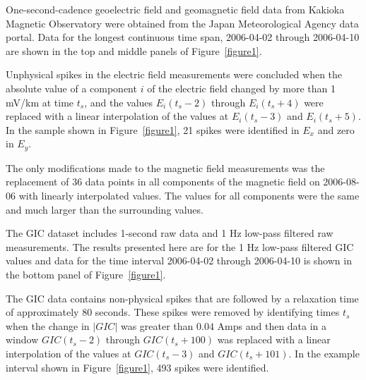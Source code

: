 \documentclass[draft,linenumbers]{agujournal2018}
\begin{document}
One-second-cadence geoelectric field and geomagnetic field data from Kakioka Magnetic Observatory were obtained from the Japan Meteorological Agency data portal. Data for the longest continuous time span, 2006-04-02 through 2006-04-10 are shown in the top and middle panels of Figure~\ref{figure1}.

Unphysical spikes in the electric field measurements were concluded when the absolute value of a component $i$ of the electric field changed by more than 1 mV/km at time $t_s$, and the values $E_i(t_s-2)$ through $E_i(t_s+4)$ were replaced with a linear interpolation of the values at $E_i(t_s-3)$ and $E_i(t_s + 5)$. In the sample shown in Figure~\ref{figure1}, 21 spikes were identified in $E_x$ and zero in $E_y$.

The only modifications made to the magnetic field measurements was the replacement of 36 data points in all components of the magnetic field on 2006-08-06 with linearly interpolated values. The values for all components were the same and much larger than the surrounding values.

The GIC dataset includes 1-second raw data and 1 Hz low-pass filtered raw measurements.  The results presented here are for the 1 Hz low-pass filtered GIC values and data for the time interval 2006-04-02 through 2006-04-10 is shown in the bottom panel of Figure~\ref{figure1}.

The GIC data contains non-physical spikes that are followed by a relaxation time of approximately 80 seconds. These spikes were removed by identifying times $t_s$ when the change in $|GIC|$ was greater than $0.04$ Amps and then data in a window $GIC(t_s-2)$ through $GIC(t_s+100)$ was replaced with a linear interpolation of the values at $GIC(t_s-3)$ and $GIC(t_s + 101)$. In the example interval shown in Figure~\ref{figure1}, 493 spikes were identified.
\end{document}
